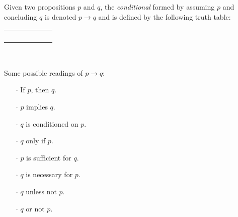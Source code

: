 \begin{definition}
    \begin{center}
        \begin{minipage}[t]{.55\linewidth}
            Given two propositions \(p\) and \(q\),
            the \emph{conditional} formed by assuming \(p\) and concluding \(q\)
            is denoted \(p \rightarrow q\) and is defined by the following truth table:
            \begin{table}[H]
                \centering
                \label{tab:implies}
                \begin{tabular}{|CcCc||Cc|}
                    \hline
                     &  &  \\ \hline
                    \thead{\(\top\)} & \thead{\(\top\)} &  \\
                    \thead{\(\top\)} & \thead{\(\bot\)} &  \\
                    \thead{\(\bot\)} & \thead{\(\top\)} &  \\
                    \thead{\(\bot\)} & \thead{\(\bot\)} &  \\ \hline
                \end{tabular}
            \end{table}
        \end{minipage}%
        \begin{minipage}[t]{.05\linewidth}
            ~
        \end{minipage}%
        \begin{minipage}[t]{.4\linewidth}
            Some possible readings of \(p \rightarrow q\):\\
            \begin{itemize}
                \item[\(\cdot\)]
                    If \(p\), then \(q\).
                \item[\(\cdot\)]
                    \(p\) implies \(q\).
                \item[\(\cdot\)]
                    \(q\) is conditioned on \(p\).
                \item[\(\cdot\)]
                    \(q\) only if \(p\).
                \item[\(\cdot\)]
                    \(p\) is sufficient for \(q\).
                \item[\(\cdot\)]
                    \(q\) is necessary for \(p\).
                \item[\(\cdot\)]
                    \(q\) unless not \(p\).
                \item[\(\cdot\)]
                    \(q\) or not \(p\).
            \end{itemize}
        \end{minipage}
    \end{center}
\end{definition}

